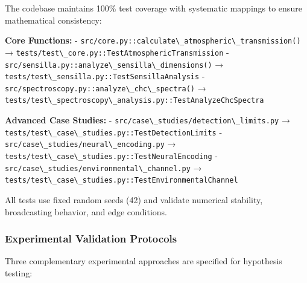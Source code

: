\documentclass[
  13pt,
  a4paperpaper,
  12pt]{article}
\newcommand{\passthrough}[1]{#1}
\begin{document}
The codebase maintains 100\% test coverage with systematic mappings to
ensure mathematical consistency:

\textbf{Core Functions:} -
\passthrough{\lstinline!src/core.py::calculate\_atmospheric\_transmission()!}
→
\passthrough{\lstinline!tests/test\_core.py::TestAtmosphericTransmission!}
-
\passthrough{\lstinline!src/sensilla.py::analyze\_sensilla\_dimensions()!}
→
\passthrough{\lstinline!tests/test\_sensilla.py::TestSensillaAnalysis!}
- \passthrough{\lstinline!src/spectroscopy.py::analyze\_chc\_spectra()!}
→
\passthrough{\lstinline!tests/test\_spectroscopy\_analysis.py::TestAnalyzeChcSpectra!}

\textbf{Advanced Case Studies:} -
\passthrough{\lstinline!src/case\_studies/detection\_limits.py!} →
\passthrough{\lstinline!tests/test\_case\_studies.py::TestDetectionLimits!}
- \passthrough{\lstinline!src/case\_studies/neural\_encoding.py!} →
\passthrough{\lstinline!tests/test\_case\_studies.py::TestNeuralEncoding!}
- \passthrough{\lstinline!src/case\_studies/environmental\_channel.py!}
→
\passthrough{\lstinline!tests/test\_case\_studies.py::TestEnvironmentalChannel!}

All tests use fixed random seeds (42) and validate numerical stability,
broadcasting behavior, and edge conditions.

\subsubsection{Experimental Validation
Protocols}\label{experimental-validation-protocols}

Three complementary experimental approaches are specified for hypothesis
testing:
\end{document}
